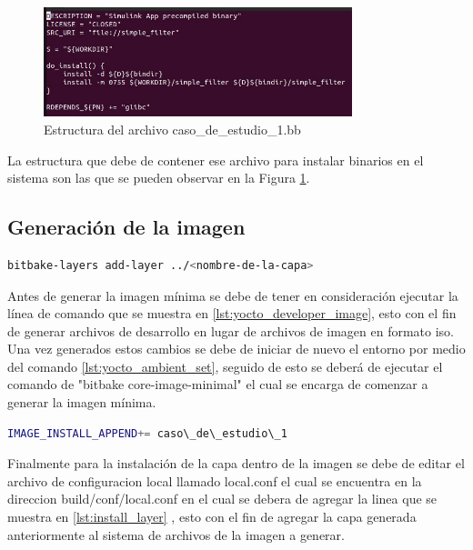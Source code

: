 \begin{figure}[h!]
    \centering
    \includegraphics[width=0.8\textwidth]{fig/especifico_2/bbfilestructure.jpg}
    \caption{Estructura del archivo caso\_de\_estudio\_1.bb}
    \label{fig:estructura_archivo_bb}
\end{figure}

La estructura que debe de contener ese archivo para instalar binarios en el sistema son las que se pueden observar en la Figura \ref{fig:estructura_archivo_bb}.

\subsection{Generación de la imagen}\label{subsec:generacion_imagen_minima}

\begin{lstlisting}[language=bash, caption={Generar archivos de desarrollador, Yocto }, label=lst:yocto_developer_image]
    bitbake-layers add-layer ../<nombre-de-la-capa>
\end{lstlisting}

Antes de generar la imagen mínima se debe de tener en consideración ejecutar la línea de comando que se muestra en \ref{lst:yocto_developer_image}, esto con el fin de generar archivos de desarrollo en lugar de archivos de imagen en formato iso. Una vez generados estos cambios se debe de iniciar de nuevo el entorno por medio del comando \ref{lst:yocto_ambient_set}, seguido de esto se deberá de ejecutar el comando de "bitbake core-image-minimal" el cual se encarga de comenzar a generar la imagen mínima.

\begin{lstlisting}[language=bash, caption={Instalar la capa generada, Yocto }, label=lst:install_layer]
    IMAGE_INSTALL_APPEND+= caso\_de\_estudio\_1
\end{lstlisting}

Finalmente para la instalación de la capa dentro de la imagen se debe de editar el archivo de configuracion local llamado local.conf el cual se encuentra en la direccion build/conf/local.conf en el cual se debera de agregar la linea que se muestra en \ref{lst:install_layer} , esto con el fin de agregar la capa generada anteriormente al sistema de archivos de la imagen a generar.


